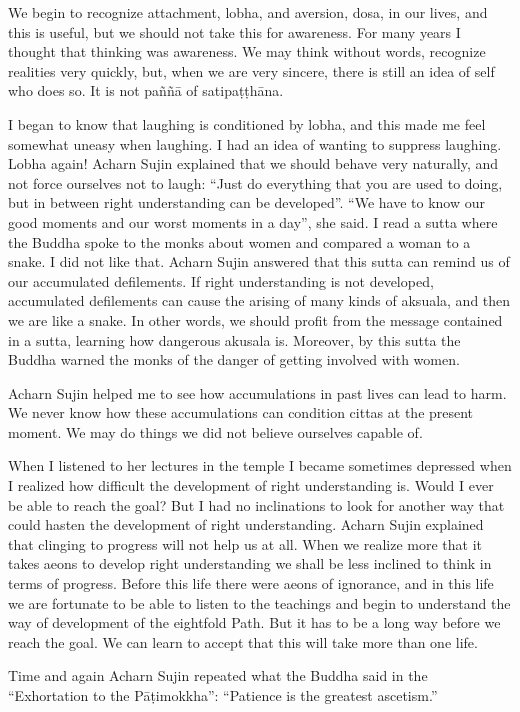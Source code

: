 We begin to recognize attachment, lobha, and aversion, dosa, in our lives, and this is useful, but we should not take this for awareness. For many years I thought that thinking was awareness. We may think without words, recognize realities very quickly, but, when we are very sincere, there is still an idea of self who does so. It is not paññā of satipaṭṭhāna.

I began to know that laughing is conditioned by lobha, and this made me feel somewhat uneasy when laughing. I had an idea of wanting to suppress laughing. Lobha again! Acharn Sujin explained that we should behave very naturally, and not force ourselves not to laugh: ``Just do everything that you are used to doing, but in between right understanding can be developed''. ``We have to know our good moments and our worst moments in a day'', she said. I read a sutta where the Buddha spoke to the monks about women and compared a woman to a snake. I did not like that. Acharn Sujin answered that this sutta can remind us of our accumulated defilements. If right understanding is not developed, accumulated defilements can cause the arising of many kinds of aksuala, and then we are like a snake. In other words, we should profit from the message contained in a sutta, learning how dangerous akusala is. Moreover, by this sutta the Buddha warned the monks of the danger of getting involved with women.

Acharn Sujin helped me to see how accumulations in past lives can lead to harm. We never know how these accumulations can condition cittas at the present moment. We may do things we did not believe ourselves capable of.

When I listened to her lectures in the temple I became sometimes depressed when I realized how difficult the development of right understanding is. Would I ever be able to reach the goal? But I had no inclinations to look for another way that could hasten the development of right understanding. Acharn Sujin explained that clinging to progress will not help us at all. When we realize more that it takes aeons to develop right understanding we shall be less inclined to think in terms of progress. Before this life there were aeons of ignorance, and in this life we are fortunate to be able to listen to the teachings and begin to understand the way of development of the eightfold Path. But it has to be a long way before we reach the goal. We can learn to accept that this will take more than one life.

Time and again Acharn Sujin repeated what the Buddha said in the ``Exhortation to the Pāṭimokkha”: ``Patience is the greatest ascetism.''




